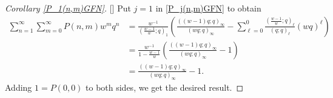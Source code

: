 \documentclass[12pt,reqno]{amsart}
\renewcommand{\(}{\left\(}
\renewcommand{\)}{\right\)}
\renewcommand{\[}{\left\[}
\renewcommand{\]}{\right\]}
\numberwithin{equation}{section}
\theoremstyle{plain}
\begin{document}

\begin{proof}[Corollary \textup{\ref{P_1(n,m)GFN}}][]
Put $j=1$ in \eqref{P_j(n,m)GFN} to obtain
\begin{align*}
\sum_{n=1}^{\infty}\sum_{m=0}^{\infty} P(n,m)w^mq^n &=\frac{w^{-1}}{(\frac{w-1}{w};q)_1}\left(\frac{((w-1)q;q)_{\infty}}{(wq;q)_{\infty}}-\sum_{\ell=0}^{0}\frac{(\frac{w-1}{w};q)_{\ell}}{(q;q)_\ell}(wq)^\ell\right) \\
&= \frac{w^{-1}}{1 - \frac{w-1}{w}} \left(\frac{((w-1)q;q)_{\infty}}{(wq;q)_{\infty}} - 1 \right)  \\
&= \frac{((w-1)q;q)_{\infty}}{(wq;q)_{\infty}} - 1.
\end{align*}
Adding $1 = P(0, 0)$ to both sides, we get the desired result.
\end{proof}
\end{document}
